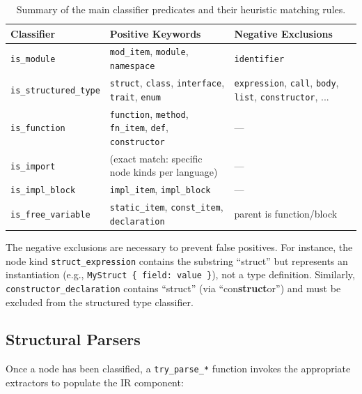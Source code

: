 \begin{table}[htpb]
  \centering
  \small
  \begin{tabular}{|l|l|l|}
    \hline
    \textbf{Classifier} & \textbf{Positive Keywords} & \textbf{Negative Exclusions} \\ \hline
    \texttt{is\_module} & \texttt{mod\_item}, \texttt{module}, \texttt{namespace} & \texttt{identifier} \\ \hline
    \texttt{is\_structured\_type} & \texttt{struct}, \texttt{class}, \texttt{interface}, \texttt{trait}, \texttt{enum} & \texttt{expression}, \texttt{call}, \texttt{body}, \texttt{list}, \texttt{constructor}, ... \\ \hline
    \texttt{is\_function} & \texttt{function}, \texttt{method}, \texttt{fn\_item}, \texttt{def}, \texttt{constructor} & --- \\ \hline
    \texttt{is\_import} & (exact match: specific node kinds per language) & --- \\ \hline
    \texttt{is\_impl\_block} & \texttt{impl\_item}, \texttt{impl\_block} & --- \\ \hline
    \texttt{is\_free\_variable} & \texttt{static\_item}, \texttt{const\_item}, \texttt{declaration} & parent is function/block \\ \hline
  \end{tabular}
  \caption{Summary of the main classifier predicates and their heuristic matching rules.}
  \label{tab:classifiers}
\end{table}

The negative exclusions are necessary to prevent false positives. For instance, the node kind \texttt{struct\_expression} contains the substring ``struct'' but represents an instantiation (e.g., \texttt{MyStruct \{ field: value \}}), not a type definition. Similarly, \texttt{constructor\_declaration} contains ``struct'' (via ``con\textbf{struct}or'') and must be excluded from the structured type classifier.

\subsection{Structural Parsers}

Once a node has been classified, a \texttt{try\_parse\_*} function invokes the appropriate extractors to populate the IR component:

